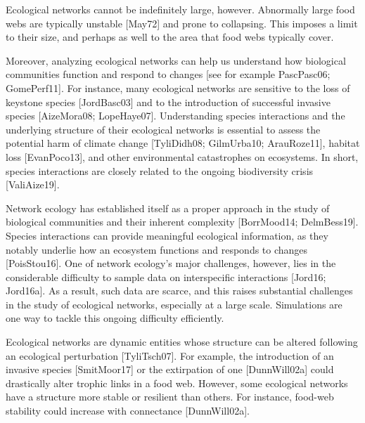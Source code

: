 Ecological networks cannot be indefinitely large, however. Abnormally large food
webs are typically unstable [May72] and prone to collapsing. This
imposes a limit to their size, and perhaps as well to the area that food webs
typically cover.


Moreover, analyzing ecological networks can help us understand how biological
communities function and respond to changes [see for example PascPasc06;
GomePerf11]. For instance, many ecological networks are sensitive to the loss
of keystone species [JordBasc03] and to the introduction of successful invasive
species [AizeMora08; LopeHaye07]. Understanding species interactions and the
underlying structure of their ecological networks is essential to assess the
potential harm of climate change [TyliDidh08; GilmUrba10; ArauRoze11],
habitat loss [EvanPoco13], and other environmental catastrophes on ecosystems.
In short, species interactions are closely related to the ongoing biodiversity
crisis [ValiAize19].  

Network
ecology has established itself as a proper approach in the study of biological
communities and their inherent complexity [BorrMood14; DelmBess19]. Species
interactions can provide meaningful ecological information, as they notably
underlie how an ecosystem functions and responds to changes [PoisStou16]. One
of network ecology's major challenges, however, lies in the considerable
difficulty to sample data on interspecific interactions [Jord16; Jord16a]. As
a result, such data are scarce, and this raises substantial challenges in the
study of ecological networks, especially at a large scale. Simulations are one
way to tackle this ongoing difficulty efficiently.

Ecological networks are dynamic entities whose
structure can be altered following an ecological perturbation [TyliTsch07]. For
example, the introduction of an invasive species [SmitMoor17] or the
extirpation of one [DunnWill02a] could drastically alter trophic links in a
food web. However, some ecological networks have a structure more stable or
resilient than others. For instance, food-web stability could increase with
connectance [DunnWill02a].

